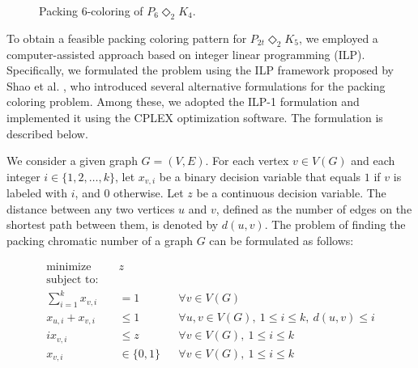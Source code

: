 \documentclass{article}
\begin{document}
\begin{figure}[H]
\centering
{}
\caption{Packing 6-coloring of $P_{6} \mathbin{\Diamond_2} K_4$.}\label{fig:P6_K4}
\end{figure}

To obtain a feasible packing coloring pattern for $P_{2t} \Diamond_2 K_5$, we employed a computer-assisted approach based on integer linear programming (ILP). Specifically, we formulated the problem using the ILP framework proposed by Shao et al. \cite{shao2015ilp}, who introduced several alternative formulations for the packing coloring problem. Among these, we adopted the ILP-1 formulation and implemented it using the CPLEX optimization software. The formulation is described below.

 We consider a given graph $G=(V, E)$. For each vertex $v \in V(G)$ and each integer $i \in \{1, 2, \ldots, k\}$, let $x_{v,i}$ be a binary decision variable that equals $1$ if $v$ is labeled with $i$, and $0$ otherwise. Let $z$ be a continuous decision variable. The distance between any two vertices $u$ and $v$, defined as the number of edges on the shortest path between them, is denoted by $d(u,v)$. The problem of finding the packing chromatic number of a graph $G$ can be formulated as follows:

\begin{align}
\text{minimize } \quad & z \label{eq:obj} \\
\text{subject to:} \quad & \nonumber \\
 \sum_{i=1}^{k} x_{v,i} &= 1 && \forall v \in V(G) \label{eq:assign} \\
 x_{u,i} + x_{v,i} &\leq 1 && \forall u,v \in V(G),\ 1 \leq i \leq k,\ d(u,v) \leq i \label{eq:indep} \\
 i x_{v,i} &\leq z && \forall v \in V(G),\ 1 \leq i \leq k \label{eq:bound} \\
 x_{v,i} &\in \{0, 1\} && \forall v \in V(G),\ 1 \leq i \leq k \label{eq:binary}
\end{align}
\end{document}
